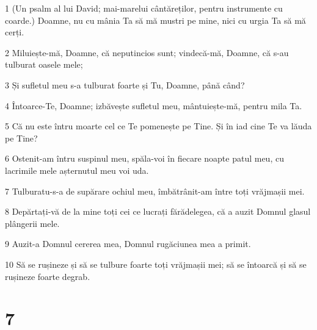 \par 1 (Un psalm al lui David; mai-marelui cântăreților, pentru instrumente cu coarde.) Doamne, nu cu mânia Ta să mă mustri pe mine, nici cu urgia Ta să mă cerți.
\par 2 Miluiește-mă, Doamne, că neputincios sunt; vindecă-mă, Doamne, că s-au tulburat oasele mele;
\par 3 Și sufletul meu s-a tulburat foarte și Tu, Doamne, până când?
\par 4 Întoarce-Te, Doamne; izbăvește sufletul meu, mântuiește-mă, pentru mila Ta.
\par 5 Că nu este întru moarte cel ce Te pomenește pe Tine. Și în iad cine Te va lăuda pe Tine?
\par 6 Ostenit-am întru suspinul meu, spăla-voi în fiecare noapte patul meu, cu lacrimile mele așternutul meu voi uda.
\par 7 Tulburatu-s-a de supărare ochiul meu, îmbătrânit-am între toți vrăjmașii mei.
\par 8 Depărtați-vă de la mine toți cei ce lucrați fărădelegea, că a auzit Domnul glasul plângerii mele.
\par 9 Auzit-a Domnul cererea mea, Domnul rugăciunea mea a primit.
\par 10 Să se rușineze și să se tulbure foarte toți vrăjmașii mei; să se întoarcă și să se rușineze foarte degrab.

\chapter{7}

